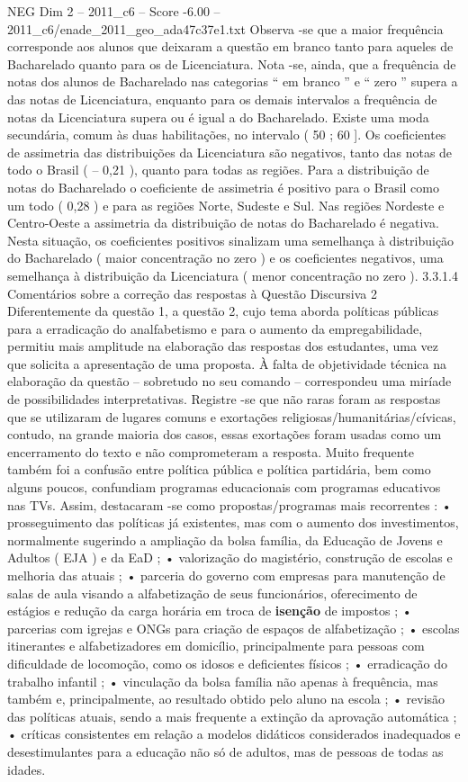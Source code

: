 \begin{textsample}{NEG Dim 2 – 2011\_c6 – Score -6.00 – 2011\_c6/enade\_2011\_geo\_ada47c37e1.txt}
Observa -se que a maior frequência corresponde aos alunos que deixaram a questão em branco tanto para aqueles de Bacharelado quanto para os de Licenciatura.
Nota -se, ainda, que a frequência de notas dos alunos de Bacharelado nas categorias “ em branco ” e “ zero ” supera a das notas de Licenciatura, enquanto para os demais intervalos a frequência de notas da Licenciatura supera ou é igual a do Bacharelado.
Existe uma moda secundária, comum às duas habilitações, no intervalo ( 50 ; 60 ].
Os coeficientes de assimetria das distribuições da Licenciatura são negativos, tanto das notas de todo o Brasil ( – 0,21 ), quanto para todas as regiões.
Para a distribuição de notas do Bacharelado o coeficiente de assimetria é positivo para o Brasil como um todo ( 0,28 ) e para as regiões Norte, Sudeste e Sul.
Nas regiões Nordeste e Centro-Oeste a assimetria da distribuição de notas do Bacharelado é negativa.
Nesta situação, os coeficientes positivos sinalizam uma semelhança à distribuição do Bacharelado ( maior concentração no zero ) e os coeficientes negativos, uma semelhança à distribuição da Licenciatura ( menor concentração no zero ). 3.3.1.4 Comentários sobre a correção das respostas à Questão Discursiva 2 Diferentemente da questão 1, a questão 2, cujo tema aborda políticas públicas para a erradicação do analfabetismo e para o aumento da empregabilidade, permitiu mais amplitude na elaboração das respostas dos estudantes, uma vez que solicita a apresentação de uma proposta.
À falta de objetividade técnica na elaboração da questão – sobretudo no seu comando – correspondeu uma miríade de possibilidades interpretativas.
Registre -se que não raras foram as respostas que se utilizaram de lugares comuns e exortações religiosas/humanitárias/cívicas, contudo, na grande maioria dos casos, essas exortações foram usadas como um encerramento do texto e não comprometeram a resposta.
Muito frequente também foi a confusão entre política pública e política partidária, bem como alguns poucos, confundiam programas educacionais com programas educativos nas TVs.
Assim, destacaram -se como propostas/programas mais recorrentes : • prosseguimento das políticas já existentes, mas com o aumento dos investimentos, normalmente sugerindo a ampliação da bolsa família, da Educação de Jovens e Adultos ( EJA ) e da EaD ; • valorização do magistério, construção de escolas e melhoria das atuais ; • parceria do governo com empresas para manutenção de salas de aula visando a alfabetização de seus funcionários, oferecimento de estágios e redução da carga horária em troca de \textbf{isenção} de impostos ; • parcerias com igrejas e ONGs para criação de espaços de alfabetização ; • escolas itinerantes e alfabetizadores em domicílio, principalmente para pessoas com dificuldade de locomoção, como os idosos e deficientes físicos ; • erradicação do trabalho infantil ; • vinculação da bolsa família não apenas à frequência, mas também e, principalmente, ao resultado obtido pelo aluno na escola ; • revisão das políticas atuais, sendo a mais frequente a extinção da aprovação automática ; • críticas consistentes em relação a modelos didáticos considerados inadequados e desestimulantes para a educação não só de adultos, mas de pessoas de todas as idades.

\end{textsample}
